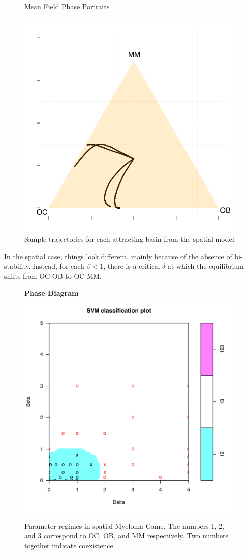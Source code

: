 \documentclass[12pt]{report}
\begin{document}
\begin{figure}[htb]
\caption{Mean Field Phase Portraits}
\end{figure}

\begin{figure}[H]
\centering
\includegraphics[width = 0.4 \linewidth]{Diagrams/dingli_trajectories}
\caption{Sample trajectories for each attracting basin from the spatial model}
\end{figure}
In the spatial case, things look different, mainly because of the absence of bi-stability. Instead, for each $\beta < 1$, there is a critical $\delta$ at which the equilibrium shifts from OC-OB to OC-MM.  

\pagebreak

\begin{figure}[!h]
\centering
\textbf{Phase Diagram}
\includegraphics[width = 0.8 \linewidth]{Diagrams/dingli_phase-cropped}
\caption{Parameter regimes in spatial Myeloma Game. The numbers 1, 2, and 3 correspond to OC, OB, and MM respectively. Two numbers together indicate coexistence}
\end{figure}
\end{document}
